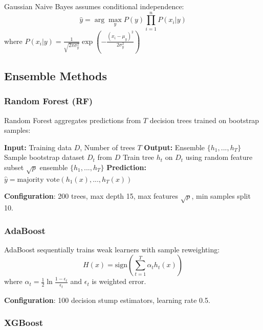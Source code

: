 \documentclass[journal]{IEEEtran}
\begin{document}
Gaussian Naive Bayes assumes conditional independence:
\begin{equation}
\hat{y} = \arg\max_y P(y) \prod_{i=1}^{n} P(x_i | y)
\end{equation}
where $P(x_i|y) = \frac{1}{\sqrt{2\pi\sigma_y^2}} \exp\left(-\frac{(x_i-\mu_y)^2}{2\sigma_y^2}\right)$

\subsection{Ensemble Methods}

\subsubsection{Random Forest (RF)}

Random Forest aggregates predictions from $T$ decision trees trained on bootstrap samples:

\begin{algorithm}[h]
\caption{Random Forest Training}
\begin{algorithmic}[1]
\STATE \textbf{Input:} Training data $D$, Number of trees $T$
\STATE \textbf{Output:} Ensemble $\{h_1, ..., h_T\}$
    \STATE Sample bootstrap dataset $D_t$ from $D$
    \STATE Train tree $h_t$ on $D_t$ using random feature subset $\sqrt{p}$
\ENDFOR
\RETURN ensemble $\{h_1, ..., h_T\}$
\STATE \textbf{Prediction:} $\hat{y} = \text{majority vote}(h_1(x), ..., h_T(x))$
\end{algorithmic}
\end{algorithm}

\textbf{Configuration}: 200 trees, max depth 15, max features $\sqrt{p}$, min samples split 10.

\subsubsection{AdaBoost}

AdaBoost sequentially trains weak learners with sample reweighting:
\begin{equation}
H(x) = \text{sign}\left(\sum_{t=1}^{T} \alpha_t h_t(x)\right)
\end{equation}
where $\alpha_t = \frac{1}{2}\ln\frac{1-\epsilon_t}{\epsilon_t}$ and $\epsilon_t$ is weighted error.

\textbf{Configuration}: 100 decision stump estimators, learning rate 0.5.

\subsubsection{XGBoost}
\end{document}
